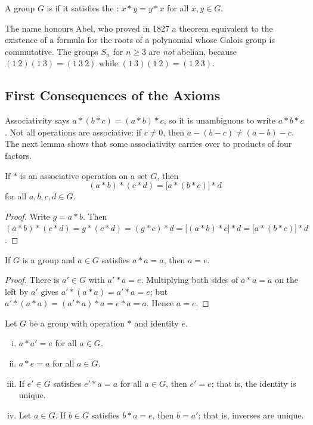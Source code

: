 \begin{definition}
	A group \(G\) is  if it satisfies the :
	\(x*y = y*x\) for all \(x, y \in G\).
\end{definition}

The name honours Abel, who proved in 1827 a theorem equivalent to the existence of a
formula for the roots of a polynomial whose Galois group is commutative. The groups
\(S_n\) for \(n \geq 3\) are \emph{not} abelian, because
\((1\ 2)(1\ 3) = (1\ 3\ 2)\) while \((1\ 3)(1\ 2) = (1\ 2\ 3)\).

\subsection{First Consequences of the Axioms}

Associativity says \(a*(b*c) = (a*b)*c\), so it is unambiguous to write \(a*b*c\). Not
all operations are associative: if \(c \neq 0\), then
\(a - (b-c) \neq (a-b) - c\). The next lemma shows that some associativity carries over to
products of four factors.

\begin{lemma}\label{lem:assoc4}
	If \(*\) is an associative operation on a set \(G\), then
	\[
		(a*b)*(c*d) = \bigl[a*(b*c)\bigr]*d
	\]
	for all \(a,b,c,d \in G\).
\end{lemma}

\begin{proof}
	Write \(g = a*b\). Then
	\((a*b)*(c*d) = g*(c*d) = (g*c)*d = \bigl[(a*b)*c\bigr]*d = \bigl[a*(b*c)\bigr]*d\).
\end{proof}

\begin{lemma}\label{lem:idempotent}
	If \(G\) is a group and \(a \in G\) satisfies \(a*a = a\), then \(a = e\).
\end{lemma}

\begin{proof}
	There is \(a' \in G\) with \(a'*a = e\). Multiplying both sides of \(a*a = a\) on the
	left by \(a'\) gives \(a'*(a*a) = a'*a = e\); but
	\(a'*(a*a) = (a'*a)*a = e*a = a\). Hence \(a = e\).
\end{proof}

\begin{proposition}\label{prop:group-basics}
	Let \(G\) be a group with operation \(*\) and identity \(e\).
	\begin{enumerate}[(i)]
		\item \(a*a' = e\) for all \(a \in G\).
		\item \(a*e = a\) for all \(a \in G\).
		\item If \(e' \in G\) satisfies \(e'*a = a\) for all \(a \in G\), then \(e' = e\);
		      that is, the identity is unique.
		\item Let \(a \in G\). If \(b \in G\) satisfies \(b*a = e\), then \(b = a'\); that
		      is, inverses are unique.
	\end{enumerate}
\end{proposition}

